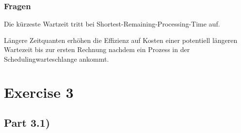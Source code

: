 \documentclass[10pt,a4paper]{article}
\begin{document}
\subsubsection*{Fragen}

Die kürzeste Wartzeit tritt bei Shortest-Remaining-Processing-Time auf.

Längere Zeitquanten erhöhen die Effizienz auf Kosten einer potentiell längeren Wartezeit bis zur ersten Rechnung nachdem ein Prozess in der Schedulingwarteschlange ankommt.

\section*{Exercise 3}

\subsection*{Part 3.1)}
\end{document}
